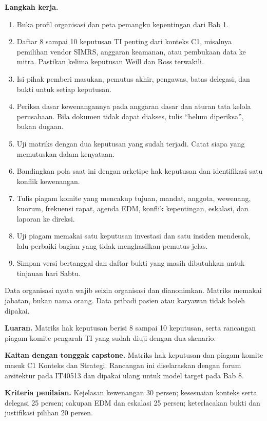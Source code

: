 \textbf{Langkah kerja.}
\begin{enumerate}
  \item Buka profil organisasi dan peta pemangku kepentingan dari Bab 1.
  \item Daftar 8 sampai 10 keputusan TI penting dari konteks C1, misalnya pemilihan vendor SIMRS,
  anggaran keamanan, atau pembukaan data ke mitra. Pastikan kelima keputusan Weill dan Ross
  terwakili.
  \item Isi pihak pemberi masukan, pemutus akhir, pengawas, batas delegasi, dan bukti untuk setiap
  keputusan.
  \item Periksa dasar kewenangannya pada anggaran dasar dan aturan tata kelola perusahaan. Bila
  dokumen tidak dapat diakses, tulis ``belum diperiksa'', bukan dugaan.
  \item Uji matriks dengan dua keputusan yang sudah terjadi. Catat siapa yang memutuskan dalam
  kenyataan.
  \item Bandingkan pola saat ini dengan arketipe hak keputusan dan identifikasi satu konflik
  kewenangan.
  \item Tulis piagam komite yang mencakup tujuan, mandat, anggota, wewenang, kuorum, frekuensi
  rapat, agenda EDM, konflik kepentingan, eskalasi, dan laporan ke direksi.
  \item Uji piagam memakai satu keputusan investasi dan satu insiden mendesak, lalu perbaiki bagian
  yang tidak menghasilkan pemutus jelas.
  \item Simpan versi bertanggal dan daftar bukti yang masih dibutuhkan untuk tinjauan hari Sabtu.
\end{enumerate}

Data organisasi nyata wajib seizin organisasi dan dianonimkan. Matriks memakai jabatan, bukan nama
orang. Data pribadi pasien atau karyawan tidak boleh dipakai.

\textbf{Luaran.} Matriks hak keputusan berisi 8 sampai 10 keputusan, serta rancangan piagam komite
pengarah TI yang sudah diuji dengan dua skenario.

\textbf{Kaitan dengan tonggak capstone.} Matriks hak keputusan dan piagam komite masuk C1 Konteks
dan Strategi. Rancangan ini diselaraskan dengan forum arsitektur pada IT40513 dan dipakai ulang
untuk model target pada Bab 8.

\textbf{Kriteria penilaian.} Kejelasan kewenangan 30 persen; kesesuaian konteks serta delegasi 25
persen; cakupan EDM dan eskalasi 25 persen; keterlacakan bukti dan justifikasi pilihan 20 persen.

